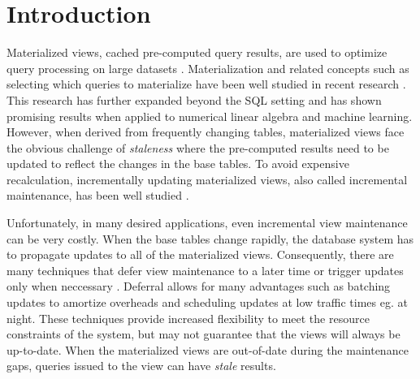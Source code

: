 \section{Introduction}
Materialized views, cached pre-computed query results, are used to optimize query processing on large datasets \cite{gupta1995maintenance, chirkova2011materialized, halevy2001answering}.
Materialization and related concepts such as selecting which queries to materialize
have been well studied in recent research \cite{zaharia2012resilient,lefevre2014opportunistic, bailis2014scalable, perez2014history}.
This research has further expanded beyond the SQL setting \cite{nikolic2014linview} and 
has shown promising results when applied to numerical linear algebra and machine learning.
However, when derived from frequently changing tables,
materialized views face the obvious challenge of \emph{staleness} where the pre-computed results need to be updated to reflect the changes in the base tables.
To avoid expensive recalculation, incrementally updating materialized views,
also called incremental maintenance, has been well studied \cite{gupta1995maintenance, chirkova2011materialized}.

Unfortunately, in many desired applications, even incremental view maintenance can be very costly. 
When the base tables change rapidly, the database system has to propagate updates to all of the materialized views.
Consequently, there are many techniques that defer view maintenance to a later time or trigger updates only when neccessary \cite{chirkova2011materialized, zhou2007lazy}.
Deferral allows for many advantages such as batching updates to amortize overheads and scheduling updates at low traffic times eg. at night.
These techniques provide increased flexibility to meet the resource constraints of the system, but may not guarantee that the views will always be up-to-date.
When the materialized views are out-of-date during the maintenance gaps, queries issued to the view can have \emph{stale} results. 

